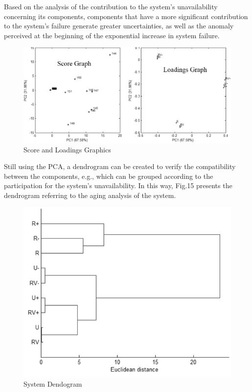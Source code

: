 \documentclass{ws-m3as}
\begin{document}
Based on the analysis of the contribution to the system's unavailability concerning its components, components that have a more significant contribution to the system's failure generate greater uncertainties, as well as the anomaly perceived at the beginning of the exponential increase in system failure.

\begin{figure}[H]
	\centering
	\includegraphics[width=1\linewidth]{Figures/ScorexLoadings.png}
	\caption{Score and Loadings Graphics}
	\label{fig:fvloadings}
	\label{fig:16}
\end{figure}

Still using the PCA, a dendrogram can be created to verify the compatibility between the components, e.g., which can be grouped according to the participation for the system's unavailability. In this way, Fig.15 presents the dendrogram referring to the aging analysis of the system.

\begin{figure} [H]
	\centering
	\includegraphics[width=1\linewidth]{Figures/FVDendogram}
	\caption{System Dendogram}
	\label{fig:fvdendogram}
	\label{fig:17}
\end{figure}
\end{document}
